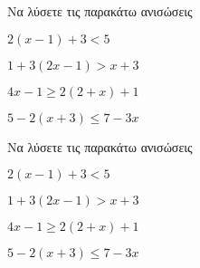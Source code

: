 Να λύσετε τις παρακάτω ανισώσεις
\begin{alist}
\item $ 2(x-1)+3<5 $
\item $ 1+3(2x-1)>x+3 $
\item $ 4x-1\geq 2(2+x)+1 $
\item $ 5-2(x+3)\leq 7-3x $
\end{alist}
Να λύσετε τις παρακάτω ανισώσεις
\begin{alist}
\item $ 2(x-1)+3<5 $
\item $ 1+3(2x-1)>x+3 $
\item $ 4x-1\geq 2(2+x)+1 $
\item $ 5-2(x+3)\leq 7-3x $
\end{alist}
